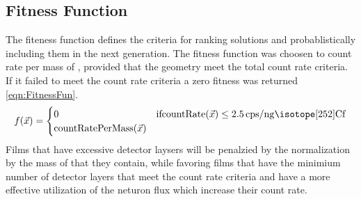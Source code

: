 \subsection{Fitness Function}
\label{sec:FitnessFunc}
The fiteness function defines the criteria for ranking solutions and probablistically including them in the next generation.
The fitness function was choosen to count rate per mass of , provided that the geometry meet the total count rate criteria.
If it failed to meet the count rate criteria a zero fitness was returned \eqref{eqn:FitnessFun}.
\begin{align}
    \label{eqn:FitnessFun}
    f(\vec{x})
    = \begin{cases}
    0 & \text{if} \text{countRate}(\vec{x}) \leq \SI{2.5}{cps\per\nano\gram\iso[252]{Cf}} \\
    \text{countRatePerMass}(\vec{x})
    \end{cases}
\end{align}
Films that have excessive detector laysers will be penalzied by the normalization by the mass of  that they contain, while favoring films that have the minimium number of detector layers that meet the count rate criteria and have a more effective utilization of the neturon flux which increase their count rate.

